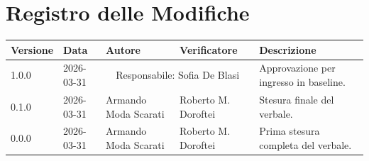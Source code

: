 \section*{Registro delle Modifiche}
\begin{table}[ht]
	\centering
	\renewcommand{\arraystretch}{1.5}
	\begin{longtable}{>{\ttfamily\small}l l l l >{\raggedright\arraybackslash}p{5cm}}
		\toprule
		\textbf{Versione} & \textbf{Data} & \textbf{Autore} & \textbf{Verificatore} & \textbf{Descrizione} \\
		\midrule
		1.0.0 & 2026-03-31 & \multicolumn{2}{c}{Responsabile: Sofia De Blasi} & Approvazione per ingresso in baseline. \\
		0.1.0 & 2026-03-31 & Armando Moda Scarati & Roberto M. Doroftei & Stesura finale del verbale. \\
		0.0.0 & 2026-03-31 & Armando Moda Scarati & Roberto M. Doroftei & Prima stesura completa del verbale. \\
		\bottomrule
	\end{longtable}
\end{table}